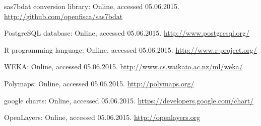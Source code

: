 \documentclass[12pt]{aghdpl}
\begin{document}
\begin{thebibliography}{99}
sas7bdat conversion library: Online, accessed 05.06.2015. \href{http://github.com/openfisca/sas7bdat}{http://github.com/openfisca/sas7bdat}

PostgreSQL database: Online, accessed 05.06.2015. \href{http://www.postgresql.org/}{http://www.postgresql.org/}

R programming language: Online, accessed 05.06.2015. \href{http://www.r-project.org/}{http://www.r-project.org/}

WEKA: Online, accessed 05.06.2015. \href{http://www.cs.waikato.ac.nz/ml/weka/}{http://www.cs.waikato.ac.nz/ml/weka/}

Polymaps: Online, accessed 05.06.2015. \href{http://polymaps.org/}{http://polymaps.org/}

google charts: Online, accessed 05.06.2015. \href{https://developers.google.com/chart/}{https://developers.google.com/chart/}

OpenLayers: Online, accessed 05.06.2015. \href{http://openlayers.org}{http://openlayers.org}


\end{thebibliography}
\end{document}
